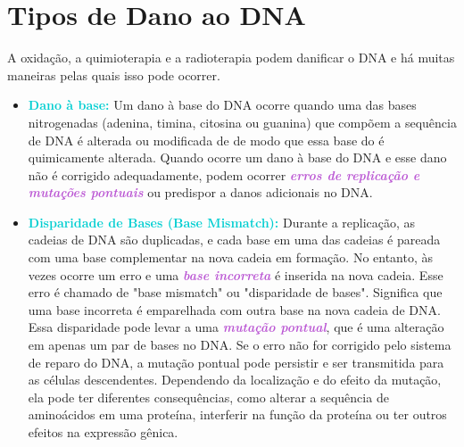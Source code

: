\documentclass[11pt,a4paper]{article}
\begin{document}
\section{Tipos de Dano ao DNA}

	A oxidação, a quimioterapia e a radioterapia podem danificar o DNA e há muitas maneiras pelas quais isso pode ocorrer.

	\begin{itemize}[label=\textcolor{CarnationPink}{$\blacktriangleright$}]
		\item \textcolor{DarkTurquoise}{\textbf{Dano à base:}} Um dano à base do DNA ocorre quando uma das bases nitrogenadas (adenina, timina, citosina ou guanina) que compõem a sequência de DNA é alterada ou modificada de de modo que essa base do é quimicamente alterada. Quando ocorre um dano à base do DNA e esse dano não é corrigido adequadamente, podem ocorrer \textcolor{MediumOrchid}{\textbf{\textit{erros de replicação e mutações pontuais}}} ou predispor a danos adicionais no DNA.
		
		\item \textcolor{DarkTurquoise}{\textbf{Disparidade de Bases (Base Mismatch):}} Durante a replicação, as cadeias de DNA são duplicadas, e cada base em uma das cadeias é pareada com uma base complementar na nova cadeia em formação. No entanto, às vezes ocorre um erro e uma \textcolor{MediumOrchid}{\textbf{\textit{base incorreta}}} é inserida na nova cadeia. Esse erro é chamado de "base mismatch" ou "disparidade de bases". Significa que uma base incorreta é emparelhada com outra base na nova cadeia de DNA. Essa disparidade pode levar a uma \textcolor{MediumOrchid}{\textbf{\textit{mutação pontual}}}, que é uma alteração em apenas um par de bases no DNA. Se o erro não for corrigido pelo sistema de reparo do DNA, a mutação pontual pode persistir e ser transmitida para as células descendentes. Dependendo da localização e do efeito da mutação, ela pode ter diferentes consequências, como alterar a sequência de aminoácidos em uma proteína, interferir na função da proteína ou ter outros efeitos na expressão gênica.
		

\end{itemize}
\end{document}
